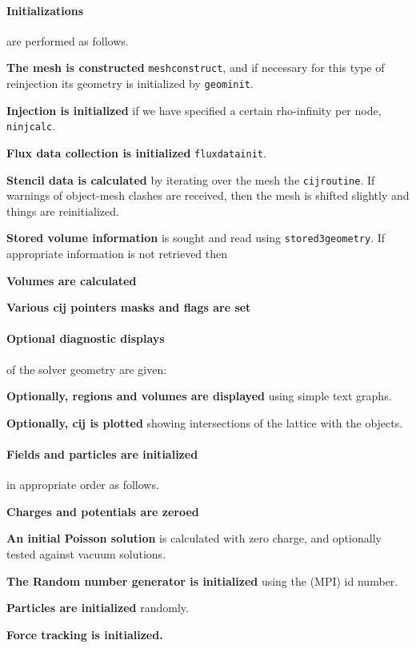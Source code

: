 \documentclass[12pt]{article}
\def\sentence#1{\par\noindent\textbf{#1}}
\begin{document}
\paragraph{Initializations} are performed as follows.
\sentence{The mesh is constructed} \verb!meshconstruct!, and if
necessary for this type of reinjection its geometry is initialized
by \verb!geominit!.

\sentence{Injection is initialized} if we have specified a certain
rho-infinity per node, \verb!ninjcalc!.

\sentence{Flux data collection is initialized} \verb!fluxdatainit!.

\sentence{Stencil data is calculated} by iterating over the mesh the
\verb!cijroutine!. If warnings of object-mesh clashes are received,
then the mesh is shifted slightly and things are reinitialized.

\sentence{Stored volume information} is sought and read using
\verb!stored3geometry!. If appropriate information is not retrieved then

\sentence{Volumes are calculated}

\sentence{Various cij pointers masks and flags are set}

\paragraph{Optional diagnostic displays} of the solver geometry are given:

\sentence{Optionally, regions and volumes are displayed} using simple text
graphs. 

\sentence{Optionally, cij is plotted} showing intersections of the
lattice with the objects.

\paragraph{Fields and particles are initialized} in appropriate order
as follows.

\sentence{Charges and potentials are zeroed}

\sentence{An initial Poisson solution} is calculated with zero
charge, and optionally tested against vacuum solutions.

\sentence{The Random number generator is initialized} using the (MPI) id
number. 

\sentence{Particles are initialized} randomly.

\sentence{Force tracking is initialized.}
\end{document}
